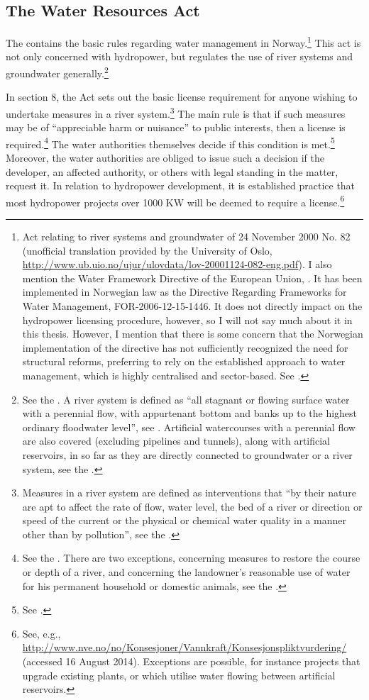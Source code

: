\subsection{The Water Resources Act}\label{sec:wra00}

The \cite{wra00} contains the basic rules regarding water management in Norway.\footnote{Act relating to river systems and groundwater of 24 November 2000 No. 82 (unofficial translation provided by the University of Oslo, \url{http://www.ub.uio.no/ujur/ulovdata/lov-20001124-082-eng.pdf}). I also mention the Water Framework Directive of the European Union, \cite{water00}. It has been implemented in Norwegian law as the Directive Regarding Frameworks for Water Management, FOR-2006-12-15-1446. It does not directly impact on the hydropower licensing procedure, however, so I will not say much about it in this thesis. However, I mention that there is some concern that the Norwegian implementation of the directive has not sufficiently recognized the need for structural reforms, preferring to rely on the established approach to water management, which is highly centralised and sector-based. See \cite{hanssen14}.} This act is not only concerned with hydropower, but regulates the use of river systems and groundwater generally.\footnote{See the \cite[1]{wra00}. A river system is defined as ``all stagnant or flowing surface water with a perennial flow, with appurtenant bottom and banks up to the highest ordinary floodwater level'', see \cite[2]{wra00}. Artificial watercourses with a perennial flow are also covered (excluding pipelines and tunnels), along with artificial reservoirs, in so far as they are directly connected to groundwater or a river system, see the \cite[2a-2b]{wra00}.} 

In section 8, the Act sets out the basic license requirement for anyone wishing to undertake measures in a river system.\footnote{Measures in a river system are defined as interventions that ``by their nature are apt to affect the rate of flow, water level, the bed of a river or direction or speed of the current or the physical or chemical water quality in a manner other than by pollution'', see the \cite[3a]{wra00}.} The main rule is that if such measures may be of ``appreciable harm or nuisance''  to public interests, then a license is required.\footnote{See the \cite[8]{wra00}. There are two exceptions, concerning measures to restore the course or depth of a river, and concerning the landowner's reasonable use of water for his permanent household or domestic animals, see the \cite[12|15]{wra00}.} The water authorities themselves decide if this condition is met.\footnote{See \cite[18]{wra00}.} Moreover, the water authorities are obliged to issue such a decision if the developer, an affected authority, or others with legal standing in the matter, request it. In relation to hydropower development, it is established practice that most hydropower projects over 1000 KW will be deemed to require a license.\footnote{See, e.g., \url{http://www.nve.no/no/Konsesjoner/Vannkraft/Konsesjonspliktvurdering/} (accessed 16 August 2014). Exceptions are possible, for instance projects that upgrade existing plants, or which utilise water flowing between artificial reservoirs.}

